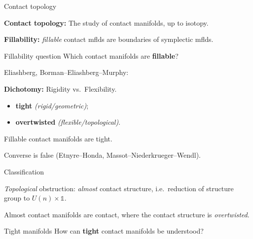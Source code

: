 \documentclass{beamer}
\begin{document}
\begin{frame}{Contact topology}

\textbf{Contact topology:} The study of contact manifolds, up to isotopy.

\medskip

\pause

\textbf{Fillability:} \emph{fillable} contact mflds are boundaries of symplectic mflds.

\pause

\begin{exampleblock}{Fillability question}  Which contact manifolds are \textbf{fillable}?
\end{exampleblock}

\pause

Eliashberg, Borman--Eliashberg--Murphy:

\begin{tcolorbox}
\textbf{Dichotomy:} Rigidity vs.\ Flexibility. 
\begin{itemize}
    \item \textbf{tight} \emph{(rigid/geometric)};
    \item  \textbf{overtwisted} \emph{(flexible/topological)}. 
\end{itemize}
\end{tcolorbox} 

\pause

\begin{theorem}
Fillable contact manifolds are tight.
\end{theorem}

Converse is false (Etnyre--Honda, Massot--Niederkrueger--Wendl).

\end{frame}

\begin{frame}{Classification}

\emph{Topological} obstruction: \emph{almost} contact structure, i.e.\ reduction of structure group to $U(n)\times \mathds 1$.

\begin{theorem}

Almost contact manifolds are contact, where the contact structure is \emph{overtwisted}.

\end{theorem}

\pause

\begin{exampleblock}{Tight manifolds}
How can \textbf{tight} contact manifolds be understood?
\end{exampleblock}
    
\end{frame}
\end{document}
